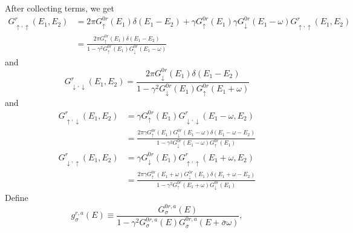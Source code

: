\documentclass[11pt,a4paper]{article}
\begin{document}
After collecting terms, we get
\begin{equation}
\begin{split}
G_{ \uparrow, \uparrow}^{r}(E_{1}, E_{2}) &= 2 \pi G_{ \uparrow}^{0r}\left(E_{1}\right) \delta\left(E_{1}-E_{2}\right) + \gamma G_{ \uparrow}^{0r}\left(E_{1}\right) \gamma G_{\downarrow}^{0r}(E_{1}-\omega)G_{ \uparrow, \uparrow}^{r}\left(E_{1}, E_{2}\right) \\
&=\frac{2 \pi G_{ \uparrow}^{0r}\left(E_{1}\right) \delta\left(E_{1}-E_{2}\right)}{1-\gamma^{2} G_{ \uparrow}^{0r}\left(E_{1}\right) G_{ \downarrow}^{0r}\left(E_{1}-\omega\right)}
\end{split}
\end{equation}
and
\begin{equation}
G_{ \downarrow, \downarrow}^{r}(E_{1}, E_{2}) = \frac{2 \pi G_{ \downarrow}^{0r}\left(E_{1}\right) \delta\left(E_{1}-E_{2}\right)}{1-\gamma^{2} G_{ \downarrow}^{0r}\left(E_{1}\right) G_{ \uparrow}^{0r}\left(E_{1}+\omega\right)}
\end{equation}
and
\begin{equation}
\begin{split}
G_{ \uparrow, \downarrow}^{r}\left(E_{1}, E_{2}\right) &=  \gamma G_{ \uparrow}^{0r} \left(E_{1}\right)  G_{ \downarrow, \downarrow}^{r}(E_{1}-\omega,E_{2}) \\
&=\frac{2 \pi \gamma G_{ \uparrow}^{0r}\left(E_{1}\right) G_{ \downarrow}^{0r}\left(E_{1}-\omega\right) \delta\left(E_{1}-\omega-E_{2}\right) }{1-\gamma^{2} G_{ \downarrow}^{0r}\left(E_{1}-\omega\right) G_{ \uparrow}^{0r}\left(E_{1}\right) }
\end{split}
\end{equation}
\begin{equation}
\begin{split}
G_{ \downarrow, \uparrow}^{r}\left(E_{1}, E_{2}\right) &= \gamma G_{ \downarrow}^{0r} \left(E_{1}\right) G_{ \uparrow, \uparrow}^{r}(E_{1}+\omega,E_{2}) \\
&=\frac{2 \pi\gamma G_{ \uparrow}^{0r}\left(E_{1}+\omega\right) G_{ \downarrow}^{0r} \left(E_{1}\right) \delta(E_{1}+\omega-E_{2}) }{1-\gamma^{2} G_{ \uparrow}^{0r}\left(E_{1}+\omega\right) G_{ \downarrow}^{0r}\left(E_{1}\right)}
\end{split}
\end{equation}
Define
\begin{equation}
g_{\sigma}^{r,a}(E) \equiv \frac{ G_{\sigma}^{0r,a}(E)} {1-\gamma^{2} G_{\sigma}^{0r,a}(E) G_{\bar{\sigma}}^{0r,a}(E+\bar{\sigma}\omega)},
\end{equation}
\end{document}

